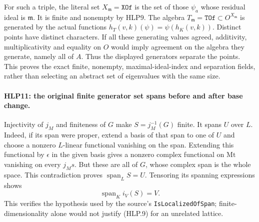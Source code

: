 For such a triple, the literal set \(X_{\mathfrak m}=\texttt{XOf}\)
is the set of those \(\psi_a\) whose residual ideal is
\(\mathfrak m\). It is finite and nonempty by HLP9. The algebra
\(T_{\mathfrak m}=\texttt{TOf}\subset O^{X_{\mathfrak m}}\) is
 generated by the actual functions
\(h_T(v,k)(\psi)=\psi(h_K(v,k))\). Distinct points have distinct
characters. If all these generating values agreed, additivity,
multiplicativity and equality on \(O\) would imply agreement on
the algebra they generate, namely all of \(A\). Thus the displayed
generators separate the points. This proves the exact finite,
nonempty, maximal-ideal-index and separation fields, rather than
selecting an abstract set of eigenvalues with the same size.

\paragraph{HLP11: the original finite generator set spans before and after base change.}
\label{claim:HLP11}
Injectivity of \(j_M\) and finiteness of \(G\) make
\(S=j_M^{-1}(G)\) finite. It spans \(U\) over \(L\). Indeed, if
its span were proper, extend a basis of that span to one of \(U\)
and choose a nonzero \(L\)-linear functional vanishing on the
span. Extending this functional by \(\epsilon\) in the given
basis gives a nonzero complex functional on \(\mathrm{Mt}\)
vanishing on every \(j_Ms\). But these are all of \(G\), whose
complex span is the whole space. This contradiction proves
\(\operatorname{span}_LS=U\). Tensoring its spanning expressions
shows
\[
                   \operatorname{span}_K i_V(S)=V.    \tag{HLP.9}
\]
This verifies the hypothesis used by the source's
\texttt{IsLocalizedOfSpan}; finite-dimensionality alone would
not justify (HLP.9) for an unrelated lattice.

